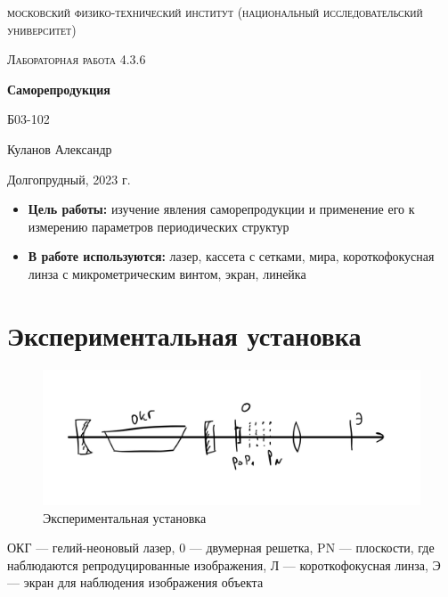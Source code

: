 \documentclass[a4paper, 12pt]{article}
\begin{document}
\begin{titlepage}
	\centering
	\vspace{5cm}
	{\scshape\LARGE московский физико-технический институт (национальный исследовательский университет) \par}
	\vspace{6cm}
	{\scshape\Large Лабораторная работа 4.3.6 \par}
	{\huge\bfseries Саморепродукция \par}
	\vspace{1cm}
	\vfill
\begin{flushright}
	{\large Б03-102}\par
	\vspace{0.3cm}
	{\LARGE Куланов Александр}
\end{flushright}
	

	\vfill


	Долгопрудный, 2023 г.
\end{titlepage}

\begin{itemize}
	\item \textbf{Цель работы:} изучение явления саморепродукции и применение его к измерению параметров периодических структур
    \item \textbf{В работе используются:} лазер, кассета с сетками, мира, короткофокусная линза с микрометрическим винтом, экран, линейка
\end{itemize}

\section{Экспериментальная установка}

\begin{figure}[H]
    \centering
    \includegraphics[width=1\textwidth]{set.jpg}
    \caption{Экспериментальная установка}
    \label{fig:set}
\end{figure}

ОКГ --- гелий-неоновый лазер, 0 --- двумерная решетка, PN --- плоскости, где наблюдаются репродуцированные изображения, Л --- короткофокусная линза, Э --- экран для наблюдения изображения объекта
\end{document}
